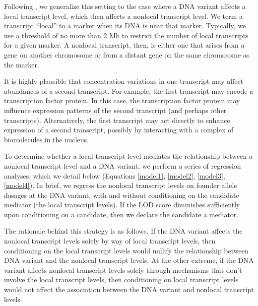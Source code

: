 \documentclass[oneside]{book}
\begin{document}
Following \citet{keller2018genetic}, we generalize this setting to the case where a DNA variant affects a local transcript level, which then affects a nonlocal transcript level. 
We term a transcript ``local'' to a marker when its DNA is near that marker. 
Typically, we use a threshold of no more than 2 Mb to restrict the 
number of local transcripts for a given marker. 
A nonlocal transcript, then, is either one that arises from a gene on another chromosome or from a distant gene on the same chromosome as the marker.

It is highly plausible that concentration variations in one transcript may affect abundances of a second transcript. 
For example, the first transcript may encode a transcription factor protein. 
In this case, the transcription factor protein may influence expression patterns of the second transcript (and perhaps other transcripts). 
Alternatively, the first transcript may act directly to enhance expression of a second transcript, possibly by interacting with a complex of biomolecules in the nucleus.





To determine whether a local transcript level mediates the relationship between a nonlocal transcript level and a DNA variant, we perform a series of regression analyses, which we detail below (Equations \ref{model1}, \ref{model2}, \ref{model3}, \ref{model4}). In brief, we regress the nonlocal transcript levels on founder allele dosages at the DNA variant, with and without conditioning on the candidate mediator (the local transcript levels). If the LOD score diminishes sufficiently upon conditioning on a candidate, then we declare the candidate a mediator.

The rationale behind this strategy is as follows. If the DNA variant affects the nonlocal transcript levels solely by way of local transcript levels, then conditioning on the local transcript levels would nullify the relationship between DNA variant and the nonlocal transcript levels. At the other extreme, if the DNA variant affects nonlocal transcript levels solely through mechanisms that don't involve the local transcript levels, then conditioning on local transcript levels would not affect the association between the DNA variant and nonlocal transcript levels.
\end{document}
